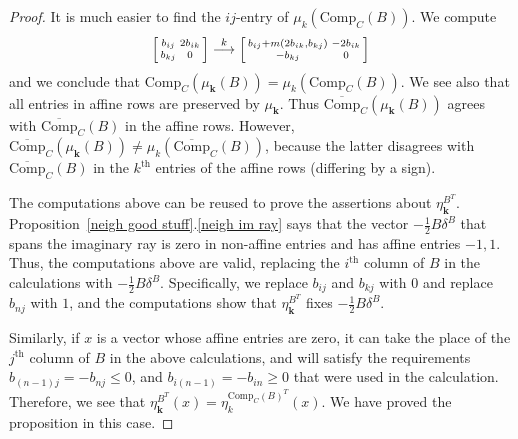 \documentclass{amsart}
\theoremstyle{definition}
\theoremstyle{remark}
\numberwithin{equation}{section}
\newcommand{\set}[1]{{\lbrace #1 \rbrace}}
\renewcommand{\th}{^\text{th}}
\newcommand{\0}{{\mathbf{0}}}
\newcommand{\Comp}{\mathrm{Comp}_C}
\newcommand{\CompPlus}{\overline{\mathrm{Comp}}_C}
\newcommand{\kk}{{\boldsymbol{k}}}
\renewcommand{\th}{^\text{th}}
\begin{document}
\begin{proof}
It is much easier to find the $ij$-entry of $\mu_k(\Comp(B))$.
We compute
\[
\begin{bsmallmatrix*}
b_{ij}&2b_{ik}\\
b_{kj}&0
\end{bsmallmatrix*}
\overset{k}{\longrightarrow}
\begin{bsmallmatrix*}
b_{ij}+m(2b_{ik},b_{kj})&-2b_{ik}\\
-b_{kj}&0
\end{bsmallmatrix*}
\]
and we conclude that $\Comp(\mu_\kk(B))=\mu_k(\Comp(B))$.
We see also that all entries in affine rows are preserved by $\mu_\kk$.
Thus $\CompPlus(\mu_\kk(B))$ agrees with $\CompPlus(B)$ in the affine rows.
However, $\CompPlus(\mu_\kk(B))\neq\mu_k(\CompPlus(B))$, because the latter disagrees with $\CompPlus(B)$ in the $k\th$ entries of the affine rows (differing by a sign).

The computations above can be reused to prove the assertions about $\eta^{B^T}_\kk$.
Proposition~\ref{neigh good stuff}.\ref{neigh im ray} says that the vector $-\frac12B\delta^B$ that spans the imaginary ray is zero in non-affine entries and has affine entries $-1,1$.
Thus, the computations above are valid, replacing the $i\th$ column of $B$ in the calculations with $-\frac12B\delta^B$.
Specifically, we replace $b_{ij}$ and $b_{kj}$ with $0$ and replace $b_{nj}$ with $1$, and the computations show that $\eta^{B^T}_\kk$ fixes $-\frac12B\delta^B$.

Similarly, if $x$ is a vector whose affine entries are zero, it can take the place of the $j\th$ column of $B$ in the above calculations, and will satisfy the requirements $b_{(n-1)j}=-b_{nj}\le0$, and $b_{i(n-1)}=-b_{in}\ge0$ that were used in the calculation.  
Therefore, we see that $\eta^{B^T}_\kk(x)=\eta^{\Comp(B)^T}_k(x)$.
We have proved the proposition in this case.

\medskip


\end{proof}
\end{document}
